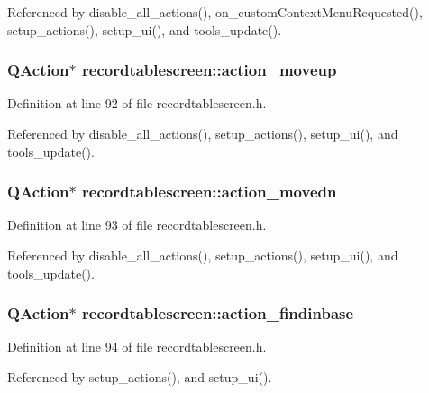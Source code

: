 Referenced by disable\_\-all\_\-actions(), on\_\-custom\-Context\-Menu\-Requested(), setup\_\-actions(), setup\_\-ui(), and tools\_\-update().
\subsubsection{\setlength{\rightskip}{0pt plus 5cm}QAction$\ast$ {\bf recordtablescreen::action\_\-moveup}\hspace{0.3cm}{\tt  [private]}}\label{classrecordtablescreen_30cf00f9d33ba2dba680f9674abe5671}




Definition at line 92 of file recordtablescreen.h.

Referenced by disable\_\-all\_\-actions(), setup\_\-actions(), setup\_\-ui(), and tools\_\-update().
\subsubsection{\setlength{\rightskip}{0pt plus 5cm}QAction$\ast$ {\bf recordtablescreen::action\_\-movedn}\hspace{0.3cm}{\tt  [private]}}\label{classrecordtablescreen_ccdcdeffdc381b2bdf2d8f550816d4ac}




Definition at line 93 of file recordtablescreen.h.

Referenced by disable\_\-all\_\-actions(), setup\_\-actions(), setup\_\-ui(), and tools\_\-update().
\subsubsection{\setlength{\rightskip}{0pt plus 5cm}QAction$\ast$ {\bf recordtablescreen::action\_\-findinbase}\hspace{0.3cm}{\tt  [private]}}\label{classrecordtablescreen_5a75aaa4075022b193223603475aaef0}




Definition at line 94 of file recordtablescreen.h.

Referenced by setup\_\-actions(), and setup\_\-ui().
